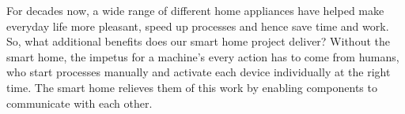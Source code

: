 For decades now, a wide range of different home appliances have helped make everyday life more pleasant, speed up processes and hence save time and work. So, what additional benefits does our smart home project deliver? Without the smart home, the impetus for a machine’s every action has to come from humans, who start processes manually and activate each device individually at the right time. The smart home relieves them of this work by enabling components to communicate with each other.
